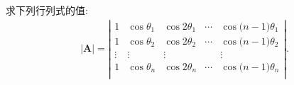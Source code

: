 \documentclass[lang=cn,newtx,10pt,scheme=chinese]{elegantbook}
\begin{document}
\begin{exercise}\label{Vandermode行列式三角函数例题}
    求下列行列式的值:
    \begin{align*}
        |\boldsymbol{A}|=\left| \begin{matrix}
            1&		\cos \theta _1&		\cos 2\theta _1&		\cdots&		\cos\mathrm{(}n-1)\theta _1\\
            1&		\cos \theta _2&		\cos 2\theta _2&		\cdots&		\cos\mathrm{(}n-1)\theta _2\\
            \vdots&		\vdots&		\vdots&		&		\vdots\\
            1&		\cos \theta _n&		\cos 2\theta _n&		\cdots&		\cos\mathrm{(}n-1)\theta _n\\
        \end{matrix} \right|.
    \end{align*}
\end{exercise}
\end{document}
